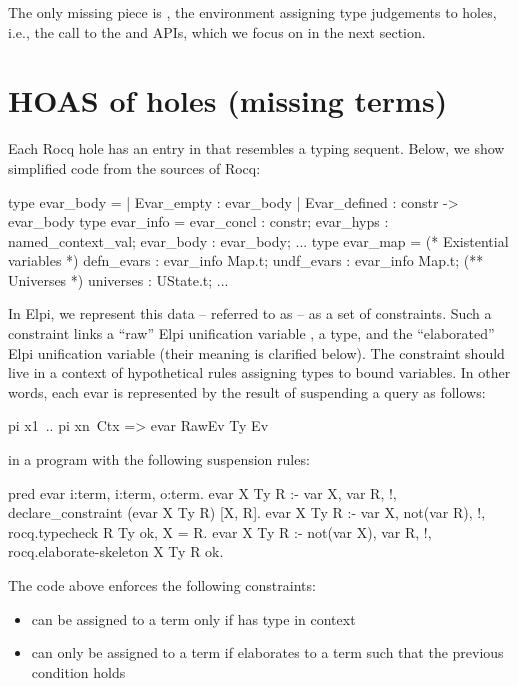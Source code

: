 \documentclass[a4paper, 11pt]{book}
\begin{document}
The only missing piece is , the environment assigning type
judgements to holes, i.e., the call to the  and
 APIs, which we focus on in the next section.

\section{HOAS of holes (missing terms)}\label{sec:hoasholes}


Each Rocq hole has an entry in  that resembles a typing sequent.
Below, we show simplified code from the sources of Rocq:

\begin{ocamlcode}
type evar_body =
  | Evar_empty : evar_body
  | Evar_defined : constr -> evar_body
type evar_info = {
  evar_concl : constr;
  evar_hyps : named_context_val;
  evar_body : evar_body;
  ...
}
type evar_map = {
  (* Existential variables *)
  defn_evars : evar_info Map.t;
  undf_evars : evar_info Map.t;
  (** Universes *)
  universes  : UState.t;
  ...
}
\end{ocamlcode}

In Elpi, we represent this data -- referred to as  -- as a set of
 constraints. Such a constraint links a ``raw'' Elpi unification
variable , a type, and the ``elaborated'' Elpi unification variable
 (their meaning is clarified below).
The constraint should live in a context of hypothetical rules 
assigning types to bound variables. In other words, each evar is represented
by the result of suspending a query as follows:

\begin{elpicode}
  pi x1\ .. pi xn\ Ctx => evar RawEv Ty Ev
\end{elpicode}

\noindent in a program with the following suspension rules:

\begin{elpicode}
pred evar i:term, i:term, o:term. %
evar X Ty R :- var X, var R,      !, declare_constraint (evar X Ty R) [X, R].
evar X Ty R :- var X, not(var R), !, rocq.typecheck R Ty ok, X = R.
evar X Ty R :- not(var X), var R, !, rocq.elaborate-skeleton X Ty R ok.
\end{elpicode}

\noindent
The code above enforces the following constraints:

\begin{itemize}
  \item {} can be assigned to a term  only if
         has type  in context 
  \item {} can only be assigned to a term  if
         elaborates to a term  such that
        the previous condition holds
\end{itemize}
\end{document}
